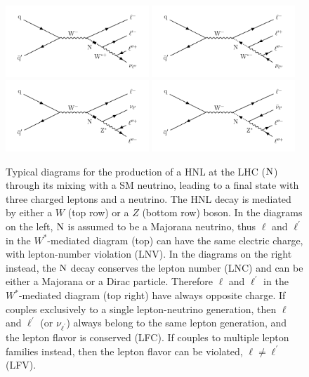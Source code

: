 \begin{figure}
\centering
\includegraphics[width=0.48\textwidth]{Figures/c3/hnl_feyn.pdf}
\includegraphics[width=0.48\textwidth]{Figures/c3/hnl_feyn_2.pdf}\\
\includegraphics[width=0.48\textwidth]{Figures/c3/hnl_z_feyn.pdf}
\includegraphics[width=0.48\textwidth]{Figures/c3/hnl_z_feyn_2.pdf}
\caption{Typical diagrams for the production of a HNL at the LHC 
($\mathrm{N}$) through its mixing with a SM neutrino, leading to a
final state with three charged leptons and a neutrino.
The HNL decay is mediated by either a $W$ (top row) or a $Z$ (bottom
row) boson.
In the diagrams on the left, $\mathrm{N}$ is assumed to be a Majorana
neutrino, thus $\ell$ and $\ell^\prime$ in the $W^\ast$-mediated
diagram (top) can have the same electric charge, with lepton-number
violation (LNV).
In the diagrams on the right instead, the $\mathrm{N}$ decay conserves the
lepton number (LNC) and can be either a Majorana or a Dirac
particle. Therefore $\ell$ and $\ell^\prime$ in the
$W^\ast$-mediated diagram (top right) have always opposite charge.
If \hnl couples exclusively to a single lepton-neutrino generation,
then $\ell$ and $\ell^\prime$ (or $\nu_{\ell^{\prime}}$) always belong
to the same lepton generation, and the lepton flavor is conserved
(LFC). If \hnl couples to multiple lepton families instead, then the
lepton flavor can be violated, $\ell\neq\ell^\prime$ (LFV).}
\label{fig:c3hnldiagram}
\end{figure}


